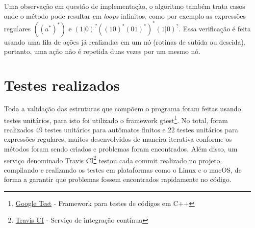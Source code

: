 \documentclass{article}
\begin{document}
            Uma observação em questão de implementação, o algoritmo também
            trata casos onde o método pode resultar em \textit{loops}
            infinitos, como por exemplo as expressões regulares $((a^{*})^{*})$
            e $(1|0)^{?}((10)^{*}(01)^{*})^{*}(1|0)^{?}$. Essa verificação é
            feita usando uma fila de ações já realizadas em um nó (rotinas de
            subida ou descida), portanto, uma ação não é repetida duas vezes
            por um mesmo nó.

    \section{Testes realizados}
        Toda a validação das estruturas que compõem o programa foram feitas
        usando testes unitários, para isto foi utilizado o framework
        gtest\footnote{\href{https://github.com/google/googletest}{Google Test}
        - Framework para testes de códigos em C++}. No total, foram realizados
        49 testes unitários para autômatos finitos e 22 testes unitários para
        expressões regulares, muitos desenvolvidos de maneira iterativa
        conforme os métodos foram sendo criados e problemas foram encontrados.
        Além disso, um serviço denominado Travis
        CI\footnote{\href{https://travis-ci.com}{Travis CI} - Serviço de
        integração contínua} testou cada commit realizado no projeto,
        compilando e realizando os testes em plataformas como o Linux e o
        macOS, de forma a garantir que problemas fossem encontrados rapidamente
        no código.
\end{document}
